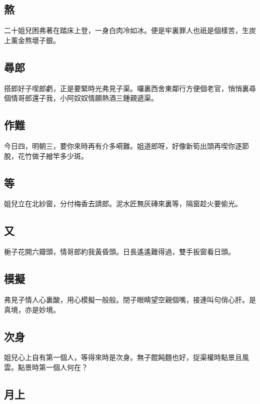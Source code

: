 \subsection*{熬}

二十姐兒困弗著在踏床上登，一身白肉冷如冰。便是牢裏罪人也祇是個樣苦，生炭上薰金熬壞子銀。

\subsection*{尋郎}

搭郎好子喫郎虧，正是要緊時光弗見子渠。囉裏西舍東鄰行方便個老官，悄悄裏尋個情哥郎還子我，小阿奴奴情願熱酒三鍾親遞渠。

\subsection*{作難}

今日四，明朝三，要你來時再有介多嗬難。姐道郎呀，好像新筍出頭再喫你逐節脫，花竹做子繒竿多少斑。

\subsection*{等}

姐兒立在北紗窗，分付梅香去請郎。泥水匠無灰磚來裏等，隔窗趁火要偷光。

\subsection*{又}

梔子花開六瓣頭，情哥郎約我黃昏頭。日長遙遙難得過，雙手扳窗看日頭。

\subsection*{模擬}

弗見子情人心裏酸，用心模擬一般般。閉子眼睛望空親個嘴，接連叫句俏心肝。是真境，亦是妙境。

\subsection*{次身}

姐兒心上自有第一個人，等得來時是次身。無子餛飩麵也好，捉渠權時點景且風雲。點景時第一個人何在？

\subsection*{月上}

